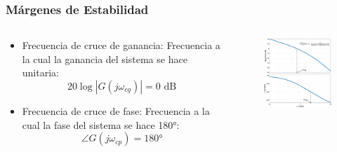 \documentclass[aspectratio=169, handout]{beamer}
\theoremstyle{definition}
\theoremstyle{plain}
\theoremstyle{remark}
\begin{document}
\begin{frame}[<+->]\frametitle{Márgenes de Estabilidad}
	\begin{columns}
		\begin{column}{0.45\textwidth}
			\begin{itemize}
				\item Frecuencia de cruce de ganancia: Frecuencia a la cual la ganancia del sistema se hace unitaria:
				\begin{equation*}
					20 \log |G(j\omega_{cg})| = 0 \text{ dB}
				\end{equation*}
				\item Frecuencia de cruce de fase: Frecuencia a la cual la fase del sistema se hace \ang{180}:
				\begin{equation*}
					\angle G(j\omega_{cp}) = \ang{180}
				\end{equation*}
			\end{itemize}
		\end{column}
		\begin{column}{0.55\textwidth}
		\begin{figure}
			\centering
			\includegraphics[width=7cm]{images/phaseGainCutFreqExample.eps}
		\end{figure}
		\end{column}
	\end{columns}	
\end{frame}
\end{document}

